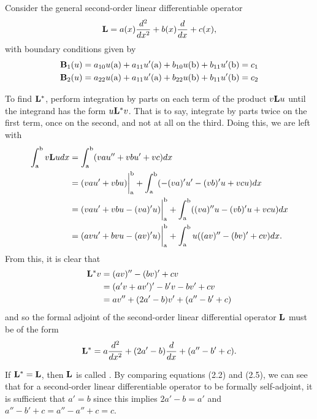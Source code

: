 \begin{example}\label{ex:selfAdjoint}
	Consider the general second-order linear differentiable operator
	\begin{equation}\label{eq:secondOrder}
		\mathrm{\bf{L}}= a(x) \frac{d^2}{dx^2} + b(x)\frac{d}{dx} + c(x),
	\end{equation}
	with boundary conditions given by
	\begin{equation*}
		\begin{split}
			\mathrm{\bf{B}}_1(u) = a_{10}u(\mathrm{a}) + a_{11}u'(\mathrm{a}) + b_{10}u(\mathrm{b}) + b_{11}u'(\mathrm{b}) = c_1\\ 
			\mathrm{\bf{B}}_2(u) = a_{22}u(\mathrm{a}) + a_{11}u'(\mathrm{a}) + b_{22}u(\mathrm{b}) + b_{11}u'(\mathrm{b}) = c_2
		\end{split}
	\end{equation*}

	To find \(\mathrm{\bf{L^*}}  \), perform integration by parts on each term of the product \(v\mathrm{\bf{L}} u\) until the integrand has the form \(u \mathrm{\bf{L}}^* v\). That is to say, integrate by parts twice on the first term, once on the second, and not at all on the third. Doing this, we are left with
	\begin{equation}
		\begin{split}
			\int_\mathrm{a}^\mathrm{b} v\mathrm{\bf{L}} u dx &= \int_\mathrm{a}^\mathrm{b} (vau''+ vbu' + vc)dx\\
			&=(vau'+vbu)\biggr\rvert_\mathrm{a}^\mathrm{b} + \int_\mathrm{a}^\mathrm{b} (-(va)'u'-(vb)'u+vcu)dx\\
			&=(vau'+vbu-(va)'u)\biggr\rvert_\mathrm{a}^\mathrm{b} + \int_\mathrm{a}^\mathrm{b} ((va)''u-(vb)'u+vcu)dx\\
			&=(avu'+bvu-(av)'u)\biggr\rvert_\mathrm{a}^\mathrm{b} + \int_\mathrm{a}^\mathrm{b} u((av)''-(bv)'+cv)dx.
		\end{split}
	\end{equation}
	From this, it is clear that 
	\begin{equation}\label{eq:2OAdjoint}
		\begin{split}
			\mathrm{\bf{L^*}} v &= (av)''-(bv)'+cv\\
			     &= (a'v+av')'-b'v-bv'+cv\\
			     &= av''+(2a'-b)v'+(a''-b'+c)
		\end{split}
	\end{equation}
	and so the formal adjoint of the second-order linear differential operator \(\mathrm{\bf{L}}\) must be of the form
	\begin{equation}
		\begin{split}
			\mathrm{\bf{L^*}} =a\frac{d^2}{dx^2} + (2a'-b)\frac{d}{dx}+(a''-b'+c).
		\end{split}
	\end{equation}
	
	
	If \(\mathrm{\bf{L^*}}  = \mathrm{\bf{L}}\), then \( \mathrm{\bf{L}}\) is called . By comparing equations (2.2) and (2.5), we can see that for a second-order linear differentiable operator to be formally self-adjoint, it is sufficient that \(a'=b\) since this implies \(2a'-b=a'\) and \(a''-b'+c=a''-a''+c=c\).
\end{example}

